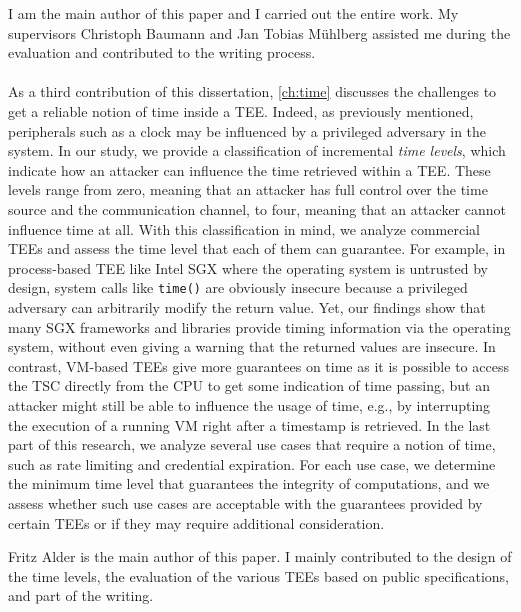 I am the main author of this paper and I carried out the entire work. My
supervisors Christoph Baumann and Jan Tobias M\"{u}hlberg assisted me during the
evaluation and contributed to the writing process.

\begin{formal}
    \papercloudrefr{}
\end{formal}

\paragraph{\papertimetitle}

As a third contribution of this dissertation, \cref{ch:time} discusses the
challenges to get a reliable notion of time inside a \ac{TEE}. Indeed, as
previously mentioned, peripherals such as a clock may be influenced by a
privileged adversary in the system. In our study, we provide a classification of
incremental \emph{time levels}, which indicate how an attacker can influence the
time retrieved within a \ac{TEE}. These levels range from zero, meaning that an
attacker has full control over the time source and the communication channel, to
four, meaning that an attacker cannot influence time at all. With this
classification in mind, we analyze commercial \acp{TEE} and assess the time
level that each of them can guarantee. For example, in process-based \ac{TEE}
like Intel \ac{SGX} where the operating system is untrusted by design, system
calls like \texttt{time()} are obviously insecure because a privileged adversary
can arbitrarily modify the return value. Yet, our findings show that many
\ac{SGX} frameworks and libraries provide timing information via the operating
system, without even giving a warning that the returned values are insecure. In
contrast, \acs{VM}-based \acp{TEE} give more guarantees on time as it is
possible to access the \ac{TSC} directly from the CPU to get some indication of
time passing, but an attacker might still be able to influence the usage of
time, e.g., by interrupting the execution of a running \ac{VM} right after a
timestamp is retrieved. In the last part of this research, we analyze several
use cases that require a notion of time, such as rate limiting and credential
expiration. For each use case, we determine the minimum time level that
guarantees the integrity of computations, and we assess whether such use cases
are acceptable with the guarantees provided by certain \acp{TEE} or if they may
require additional consideration.

Fritz Alder is the main author of this paper. I mainly contributed to the design
of the time levels, the evaluation of the various \acp{TEE} based on public
specifications, and part of the writing.


